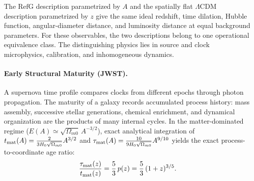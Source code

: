 \documentclass[11pt,a4paper]{article}
\newcommand{\RefG}{\mathrm{RefG}}
\begin{document}
The $\RefG$ description parametrized by $A$ and the spatially flat $\Lambda$CDM description parametrized by $z$ give the same ideal redshift, time dilation, Hubble function, angular-diameter distance, and luminosity distance at equal background parameters. For these observables, the two descriptions belong to one operational equivalence class. The distinguishing physics lies in source and clock microphysics, calibration, and inhomogeneous dynamics.

\paragraph{Early Structural Maturity (JWST).}

A supernova time profile compares clocks from different epochs through photon propagation. The maturity of a galaxy records accumulated process history: mass assembly, successive stellar generations, chemical enrichment, and dynamical organization are the products of many internal cycles. In the matter-dominated regime ($E(A) \simeq \sqrt{\Omega_{m0}}\,A^{-3/2}$), exact analytical integration of $t_{\rm mat}(A) = \frac{2}{3 H_0\sqrt{\Omega_{m0}}}A^{3/2}$ and $\tau_{\rm mat}(A) = \frac{10}{9 H_0\sqrt{\Omega_{m0}}}A^{9/10}$ yields the exact process-to-coordinate age ratio:
\begin{equation}
\frac{\tau_{\rm mat}(z)}{t_{\rm mat}(z)}
= \frac{5}{3}\,p(z)
= \frac{5}{3}\,(1+z)^{3/5}.
\end{equation}
\end{document}
